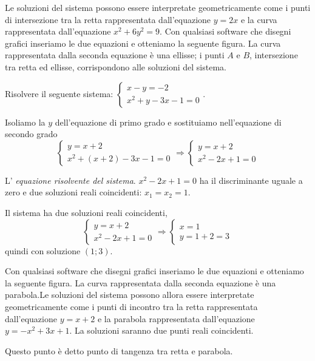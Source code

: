 \begin{esempio}
\begin{multicols}{2}
Le soluzioni del sistema possono essere interpretate geometricamente come i 
punti di intersezione tra la retta rappresentata dall'equazione \(y=2x\) e la 
curva rappresentata dall'equazione \(x^2+6y^2=9\). Con qualsiasi software che 
disegni grafici inseriamo le due equazioni e otteniamo la seguente figura.
La curva rappresentata dalla seconda equazione è una ellisse; i punti \( A \) e \( 
B \), intersezione tra retta ed ellisse, corrispondono alle soluzioni del 
sistema.
\begin{center}

\end{center}
 \end{multicols}
\end{esempio}

\begin{esempio}
Risolvere il seguente sistema: \(\left\{\begin{array}{l}x-y=-2 
\\x^2+y-3x-1=0\end{array}\right..\)

Isoliamo la \(y\) dell'equazione di primo grado e sostituiamo nell'equazione di 
secondo grado 
\[\left\{\begin{array}{l}y=x+2 \\
x^2+\left(x+2\right)-3x-1=0\end{array}\right. 
\Rightarrow\left\{\begin{array}{l}y=x+2 \\
x^2-2x+1=0\end{array}\right.\]

L' \emph{equazione risolvente del sistema}. \(x^2-2x+1=0\) ha il discriminante 
uguale a zero e due soluzioni reali coincidenti: \(x_1=x_2=1\).

Il sistema ha due soluzioni reali coincidenti, 
\[\left\{\begin{array}{l}y=x+2 \\x^2-2x+1=0\end{array}\right. 
\Rightarrow\left\{\begin{array}{l}x=1 \\
y=1+2=3\end{array}\right.\] 
quindi con soluzione \((1;3)\).
\begin{multicols}{2}
Con qualsiasi software che disegni grafici inseriamo le due equazioni e 
otteniamo la seguente figura.
La curva rappresentata dalla seconda equazione è una parabola.Le soluzioni del 
sistema possono allora essere interpretate geometricamente come i punti di 
incontro tra la retta rappresentata dall'equazione \(y=x+2\) e la parabola 
rappresentata dall'equazione \(y=-x^2+3x+1\). La soluzioni saranno due punti 
reali 
coincidenti. 

Questo punto è detto punto di tangenza tra retta e parabola.
\begin{center}

\end{center}
 \end{multicols}
\end{esempio}

